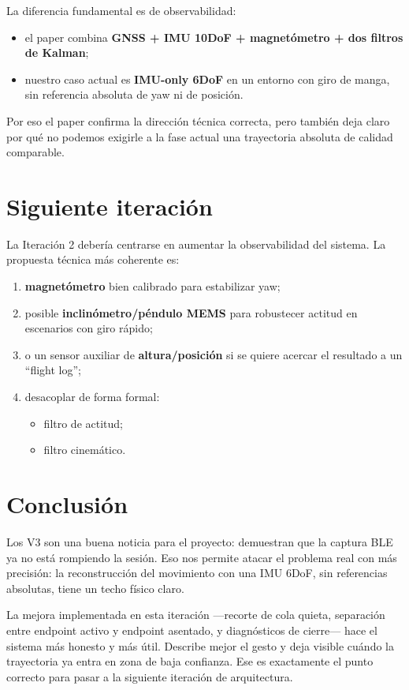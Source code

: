 \documentclass[11pt,a4paper]{article}
\begin{document}
La diferencia fundamental es de observabilidad:
\begin{itemize}[leftmargin=14pt]
  \item el paper combina \textbf{GNSS + IMU 10DoF + magnet\'ometro + dos filtros de Kalman};
  \item nuestro caso actual es \textbf{IMU-only 6DoF} en un entorno con giro de manga, sin referencia absoluta de yaw ni de posici\'on.
\end{itemize}

Por eso el paper confirma la direcci\'on t\'ecnica correcta, pero tambi\'en deja claro por qu\'e no podemos exigirle a la fase actual una trayectoria absoluta de calidad comparable.

\section{Siguiente iteraci\'on}
La Iteraci\'on 2 deber\'ia centrarse en aumentar la observabilidad del sistema. La propuesta t\'ecnica m\'as coherente es:
\begin{enumerate}[leftmargin=16pt]
  \item \textbf{magnet\'ometro} bien calibrado para estabilizar yaw;
  \item posible \textbf{inclin\'ometro/p\'endulo MEMS} para robustecer actitud en escenarios con giro r\'apido;
  \item o un sensor auxiliar de \textbf{altura/posici\'on} si se quiere acercar el resultado a un ``flight log'';
  \item desacoplar de forma formal:
    \begin{itemize}[leftmargin=14pt]
      \item filtro de actitud;
      \item filtro cinem\'atico.
    \end{itemize}
\end{enumerate}

\section*{Conclusi\'on}
Los V3 son una buena noticia para el proyecto: demuestran que la captura BLE ya no est\'a rompiendo la sesi\'on. Eso nos permite atacar el problema real con m\'as precisi\'on: la reconstrucci\'on del movimiento con una IMU 6DoF, sin referencias absolutas, tiene un techo f\'isico claro.

La mejora implementada en esta iteraci\'on ---recorte de cola quieta, separaci\'on entre endpoint activo y endpoint asentado, y diagn\'osticos de cierre--- hace el sistema m\'as honesto y m\'as \'util. Describe mejor el gesto y deja visible cu\'ando la trayectoria ya entra en zona de baja confianza. Ese es exactamente el punto correcto para pasar a la siguiente iteraci\'on de arquitectura.
\end{document}
